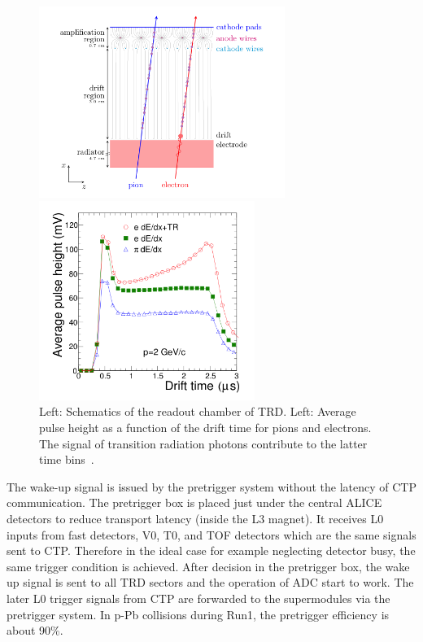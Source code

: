 \begin{figure}[!h]
 \begin{minipage}{0.5\hsize}
  \begin{center}
  \includegraphics[width=8cm]{chap3/figure/TRD/Schematics_TRDChamber.png}
  \end{center}
 \end{minipage}
 \begin{minipage}{0.5\hsize}
  \begin{center}
  \includegraphics[width=7cm]{chap3/figure/TRD/PulseHeight.png}
  \end{center}
 \end{minipage}
  \caption{Left: Schematics of the readout chamber of TRD. Left: Average pulse height as a function of the drift time for pions and electrons. The signal of transition radiation photons contribute to the latter time bins~\cite{bib_trdtdr}.}
  \label{fig_3_trdschema}
\end{figure}

The wake-up signal is issued by the pretrigger system without the latency of CTP communication.%
The pretrigger box is placed just under the central ALICE detectors to reduce transport latency (inside the L3 magnet).
It receives L0 inputs from fast detectors, V0, T0, and TOF detectors which are the same signals sent to CTP. 
Therefore in the ideal case for example neglecting detector busy, the same trigger condition is achieved. 
After decision in the pretrigger box, the wake up signal is sent to all TRD sectors and the operation of ADC start to work. 
The later L0 trigger signals from CTP are forwarded to the supermodules via the pretrigger system. 
In p-Pb collisions during Run1, the pretrigger efficiency is about 90\%. 

